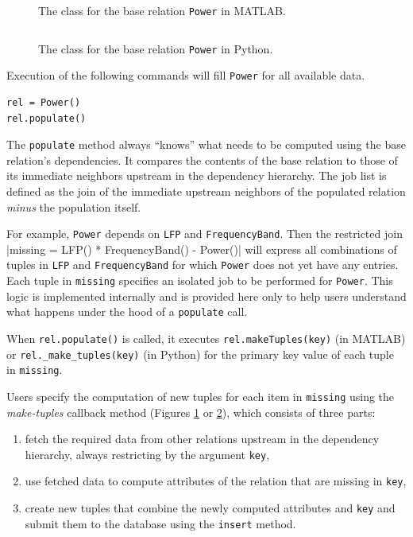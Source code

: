\documentclass[10pt,letterpaper]{article}
\newcommand{\matlab}[1]{\texttt{#1}}
\begin{document}
\begin{figure}
\begin{adjustwidth}{-2.25in}{0in}
\inputminted[frame=single,linenos=true]{matlab}{Power.m}
\caption{The class for the base relation \matlab{Power} in MATLAB.}
\label{power-m}
\end{adjustwidth}
\end{figure}

\begin{figure}
\begin{adjustwidth}{-2.25in}{0in}
\inputminted[frame=single,linenos=true]{python}{power.py}
\caption{The class for the base relation \matlab{Power} in Python.}
\label{power-py}
\end{adjustwidth}
\end{figure}

Execution of the following commands will fill \matlab{Power} for all available data.
\begin{verbatim}
rel = Power()
rel.populate()
\end{verbatim}

The \matlab{populate} method always ``knows'' what needs to be computed using the base relation's dependencies.
It compares the contents of the base relation to those of its immediate neighbors upstream in the dependency hierarchy. 
The job list is defined as the join of the immediate upstream neighbors of the populated relation \emph{minus} the population itself.

For example, \matlab{Power} depends on \matlab{LFP} and \matlab{FrequencyBand}. 
Then the restricted join 
|missing = LFP() * FrequencyBand() - Power()|
will express  all combinations of tuples in \matlab{LFP} and \matlab{FrequencyBand} for which \matlab{Power} does not yet have any entries.
Each tuple in \matlab{missing} specifies an isolated job to be performed for \matlab{Power}.
This logic is implemented internally and is provided here only to help users understand what happens under the hood of a \matlab{populate} call.

When \matlab{rel.populate()} is called, it executes  \matlab{rel.makeTuples(key)} (in MATLAB) or \matlab{rel._make_tuples(key)} (in Python) for the primary key value  of each tuple in \matlab{missing}.

Users specify the computation of new tuples for each item in \matlab{missing} using the \emph{make-tuples} callback method (Figures \ref{power-m} or \ref{power-py}),
which consists of three parts: 
\begin{enumerate}
\item fetch the required data from other relations upstream in the dependency hierarchy, always restricting by the argument \matlab{key},
\item use fetched data to compute attributes of the relation that are missing in \matlab{key},
\item create new tuples that combine the newly computed attributes and \matlab{key} and submit them to the database using the \matlab{insert} method.
\end{enumerate}
\end{document}
